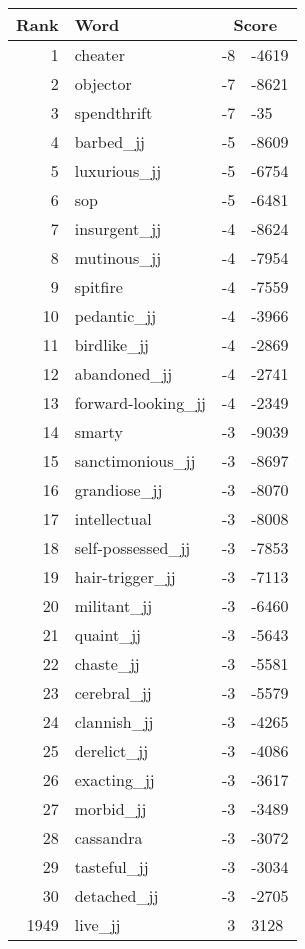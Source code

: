 \begin{longtable}[!htbp]{| rlr@{.}l |}
    \hline
    \textbf{Rank} & \textbf{Word} & \multicolumn{2}{c|}{\textbf{Score}} \\
    \hline
    \endhead
    1 & cheater & -8 & -4619 \\
    2 & objector & -7 & -8621 \\
    3 & spendthrift & -7 & -35 \\
    4 & barbed\_jj & -5 & -8609 \\
    5 & luxurious\_jj & -5 & -6754 \\
    6 & sop & -5 & -6481 \\
    7 & insurgent\_jj & -4 & -8624 \\
    8 & mutinous\_jj & -4 & -7954 \\
    9 & spitfire & -4 & -7559 \\
    10 & pedantic\_jj & -4 & -3966 \\
    11 & birdlike\_jj & -4 & -2869 \\
    12 & abandoned\_jj & -4 & -2741 \\
    13 & forward-looking\_jj & -4 & -2349 \\
    14 & smarty & -3 & -9039 \\
    15 & sanctimonious\_jj & -3 & -8697 \\
    16 & grandiose\_jj & -3 & -8070 \\
    17 & intellectual & -3 & -8008 \\
    18 & self-possessed\_jj & -3 & -7853 \\
    19 & hair-trigger\_jj & -3 & -7113 \\
    20 & militant\_jj & -3 & -6460 \\
    21 & quaint\_jj & -3 & -5643 \\
    22 & chaste\_jj & -3 & -5581 \\
    23 & cerebral\_jj & -3 & -5579 \\
    24 & clannish\_jj & -3 & -4265 \\
    25 & derelict\_jj & -3 & -4086 \\
    26 & exacting\_jj & -3 & -3617 \\
    27 & morbid\_jj & -3 & -3489 \\
    28 & cassandra & -3 & -3072 \\
    29 & tasteful\_jj & -3 & -3034 \\
    30 & detached\_jj & -3 & -2705 \\
    1949 & live\_jj & 3 & 3128 \\

\end{longtable}
